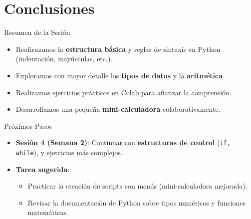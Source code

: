 \documentclass[10pt]{beamer}
\begin{document}
\section{Conclusiones}

\begin{frame}{Resumen de la Sesión}
  \begin{itemize}
    \item Reafirmamos la \textbf{estructura básica} y reglas de sintaxis en Python (indentación, mayúsculas, etc.).
    \item Exploramos con mayor detalle los \textbf{tipos de datos} y la \textbf{aritmética}.
    \item Realizamos ejercicios prácticos en Colab para afianzar la comprensión.
    \item Desarrollamos una pequeña \textbf{mini-calculadora} colaborativamente.
  \end{itemize}
\end{frame}

\begin{frame}{Próximos Pasos}
  \begin{itemize}
    \item \textbf{Sesión 4 (Semana 2)}: Continuar con \textbf{estructuras de control} (\texttt{if, while}), y ejercicios más complejos.
    \item \textbf{Tarea sugerida}:
      \begin{itemize}
        \item Practicar la creación de scripts con menús (mini-calculadora mejorada).
        \item Revisar la documentación de Python sobre tipos numéricos y funciones matemáticas.
      \end{itemize}
  \end{itemize}
\end{frame}
\end{document}
